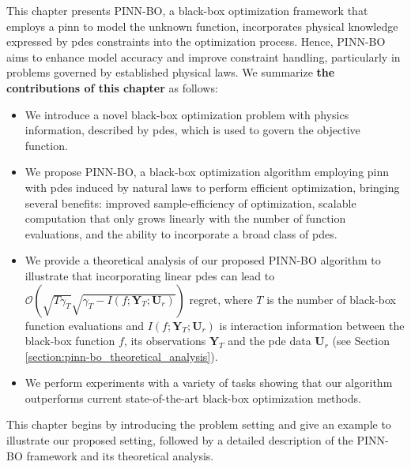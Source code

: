 This chapter presents PINN-BO, a black-box optimization framework that employs a \ac{pinn} to model the unknown function, incorporates physical knowledge expressed by \acp{pde} constraints into the optimization process. Hence, PINN-BO aims to enhance model accuracy and improve constraint handling, particularly in problems governed by established physical laws. We summarize \textbf{the contributions of this chapter} as follows:
\begin{itemize}
    \item We introduce a novel black-box optimization problem with physics information, described by \acfp{pde}, which is used to govern the objective function.
    
    \item We propose PINN-BO, a black-box optimization algorithm employing \acl{pinn} with \acfp{pde} induced by natural laws to perform efficient optimization, bringing several benefits: improved sample-efficiency of optimization, scalable computation that only grows linearly with the number of function evaluations, and the ability to incorporate a broad class of \acp{pde}.
     
    \item We provide a theoretical analysis of our proposed PINN-BO algorithm to illustrate that incorporating linear \acp{pde} can lead to $\mathcal{O}\left(\sqrt{T\gamma_T}\sqrt{\gamma_T - I (f; \mathbf{Y}_T; \mathbf{U}_r) } \right)$ regret, where $T$ is the number of black-box function evaluations and $I (f; \mathbf{Y}_T; \mathbf{U}_r)$ is interaction information between the black-box function  $f$, its observations $\mathbf{Y}_T$ and the \ac{pde} data $\mathbf{U}_r$ (see Section \ref{section:pinn-bo_theoretical_analysis}).
    
    \item We perform experiments with a variety of tasks showing that our algorithm outperforms current state-of-the-art black-box optimization methods.
\end{itemize} 
This chapter begins by introducing the problem setting and give an example to illustrate our proposed setting, followed by a detailed description of the PINN-BO framework and its theoretical analysis.

